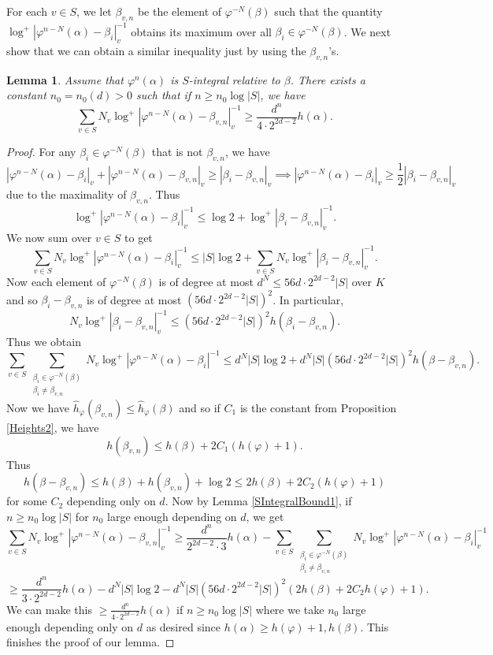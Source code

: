 \documentclass[10pt, reqno]{amsart}
\newcommand{\vphi}{\varphi}
\newcommand{\h}{\widehat{h}}
\numberwithin{theorem}{section}
\newtheorem{lemma}[theorem]{Lemma}
\numberwithin{equation}{section}
\numberwithin{example}{section}
\numberwithin{definition}{section}
\begin{document}
For each $v \in S$, we let $\beta_{v,n}$ be the element of $\vphi^{-N}(\beta)$ such that the quantity $\log^+|\vphi^{n-N}(\alpha)-\beta_i|^{-1}_v$ obtains its maximum over all $\beta_i \in \vphi^{-N}(\beta)$. We next show that we can obtain a similar inequality just by using the $\beta_{v,n}$'s. 

\begin{lemma} \label{SIntegralBound2}
Assume that $\vphi^n(\alpha)$ is $S$-integral relative to $\beta$. There exists a constant $n_0 = n_0(d) > 0$ such that if $n \geq n_0 \log |S|$, we have
$$\sum_{v \in S} N_v \log^+|\vphi^{n-N}(\alpha) - \beta_{v,n}|_v^{-1} \geq \frac{d^n}{4 \cdot 2^{2d-2}} h(\alpha).$$
\end{lemma}

\begin{proof}
For any $\beta_i \in \vphi^{-N}(\beta)$ that is not $\beta_{v,n}$, we have 
$$|\vphi^{n-N}(\alpha) - \beta_i|_v + |\vphi^{n-N}(\alpha) - \beta_{v,n}|_v \geq |\beta_i - \beta_{v,n}|_v \implies |\vphi^{n-N}(\alpha) - \beta_i|_v \geq \frac{1}{2} |\beta_i - \beta_{v,n}|_v$$
due to the maximality of $\beta_{v,n}$. Thus 
$$\log^+|\vphi^{n-N}(\alpha)-\beta_i|^{-1}_v \leq \log 2 + \log^+|\beta_i - \beta_{v,n}|_v^{-1}.$$
We now sum over $v \in S$ to get
$$\sum_{v \in S} N_v \log^+|\vphi^{n-N}(\alpha) - \beta_i|_v^{-1} \leq |S| \log 2 + \sum_{v \in S} N_v \log^+|\beta_i - \beta_{v,n}|_v^{-1}.$$
Now each element of $\vphi^{-N}(\beta)$ is of degree at most $d^{N} \leq 56 d \cdot 2^{2d-2}|S|$ over $K$ and so $\beta_i - \beta_{v,n}$ is of degree at most $(56 d \cdot 2^{2d-2}|S|)^2$. In particular, 
$$N_v \log^+|\beta_i - \beta_{v,n}|_v^{-1} \leq (56 d \cdot 2^{2d-2} |S|)^2 h(\beta_i - \beta_{v,n}).$$
Thus we obtain
$$\sum_{v \in S} \sum_{\substack{\beta_i \in \vphi^{-N}(\beta) \\ \beta_i \not = \beta_{v,n}}} N_v \log^+|\vphi^{n-N}(\alpha) - \beta_i|^{-1} \leq d^N |S| \log 2 + d^N |S| (56 d \cdot 2^{2d-2} |S|)^2 h(\beta - \beta_{v,n}).$$
Now we have 
$\h_{\vphi}(\beta_{v,n}) \leq \h_{\vphi}(\beta)$ and so if $C_1$ is the constant from Proposition \ref{Heights2}, we have
$$h(\beta_{v,n}) \leq h(\beta) + 2C_1(h(\vphi) + 1).$$
Thus 
$$h(\beta - \beta_{v,n}) \leq h(\beta) + h(\beta_{v,n}) + \log 2 \leq 2 h(\beta) + 2C_2(h(\vphi)+1)$$
for some $C_2$ depending only on $d$. Now by Lemma \ref{SIntegralBound1}, if $n \geq n_0 \log |S|$ for $n_0$ large enough depending on $d$, we get
$$\sum_{v \in S} N_v \log^+|\vphi^{n-N}(\alpha) - \beta_{v,n}|_v^{-1} \geq \frac{d^n}{2^{2d-2} \cdot 3} h(\alpha) - \sum_{v \in S} \sum_{\substack{\beta_i \in \vphi^{-N}(\beta) \\ \beta_i \not = \beta_{v,n}}} N_v \log^+|\vphi^{n-N}(\alpha) - \beta_i|_v^{-1}$$
$$\geq \frac{d^n}{3 \cdot 2^{2d-2} } h(\alpha) - d^N |S| \log 2 - d^N |S|(56 d \cdot 2^{2d-2} |S|)^2 (2 h(\beta) + 2C_2 h(\vphi)+1).$$ 
We can make this $\geq \frac{d^n}{4 \cdot 2^{2d-2}} h(\alpha)$
if $n \geq n_0 \log |S|$ where we take $n_0$ large enough depending only on $d$ as desired since $h(\alpha) \geq h(\vphi)+1,h(\beta)$. This finishes the proof of our lemma.
\end{proof}
\end{document}
